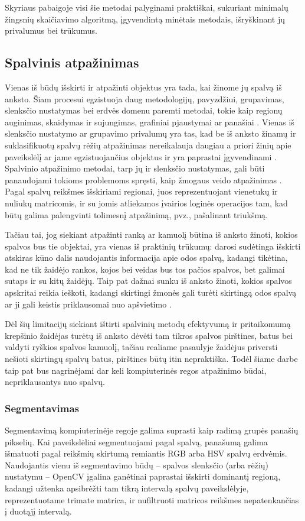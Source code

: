 \documentclass{VUMIFPSbakalaurinis}
\begin{document}
Skyriaus pabaigoje visi šie metodai palyginami praktiškai, sukuriant minimalų žingsnių skaičiavimo algoritmą, įgyvendintą minėtais metodais, išryškinant jų privalumus bei trūkumus. 

\subsection{Spalvinis atpažinimas}
Vienas iš būdų išskirti ir atpažinti objektus yra tada, kai žinome jų spalvą iš anksto. Šiam procesui egzistuoja daug metodologijų, pavyzdžiui, grupavimas, slenksčio nustatymas bei erdvės domenu paremti metodai, tokie kaip regionų auginimas, skaidymas ir sujungimas, grafiniai pjaustymai ar panašiai \cite{segmentation_trends}. Vienas iš slenksčio nustatymo ar grupavimo privalumų yra tas, kad be iš anksto žinamų ir suklasifikuotų spalvų rėžių atpažinimas nereikalauja daugiau a priori žinių apie paveikslėlį ar jame egzistuojančius objektus ir yra paprastai įgyvendinami \cite{segmentation_trends}. Spalvinio atpažinimo metodai, tarp jų ir slenksčio nustatymas, gali būti panaudojami tokioms problemoms spręsti, kaip žmogaus veido atpažinimas \cite{WANG20011983}. Pagal spalvų reikšmes išskiriami regionai, juos reprezentuojant vienetukų ir nuliukų matricomis, ir su jomis atliekamos įvairios loginės operacijos tam, kad būtų galima palengvinti tolimesnį atpažinimą, pvz., pašalinant triukšmą. 

Tačiau tai, jog siekiant atpažinti ranką ar kamuolį būtina iš anksto žinoti, kokios spalvos bus tie objektai, yra vienas iš praktinių trūkumų: darosi sudėtinga išskirti atskiras kūno dalis naudojantis informacija apie odos spalvą, kadangi tikėtina, kad ne tik žaidėjo rankos, kojos bei veidas bus tos pačios spalvos, bet galimai sutaps ir su kitų žaidėjų. Taip pat dažnai sunku iš anksto žinoti, kokios spalvos apskritai reikia ieškoti, kadangi skirtingi žmonės gali turėti skirtingą odos spalvą ar ji gali keistis priklausomai nuo apšvietimo \cite{KAKUMANU20071106}. 

Dėl šių limitacijų siekiant ištirti spalvinių metodų efektyvumą ir pritaikomumą krepšinio žaidėjas turėtų iš anksto dėvėti tam tikros spalvos pirštines, batus bei valdyti ryškios spalvos kamuolį, tačiau realiame pasaulyje žaidėjus priversti nešioti skirtingų spalvų batus, pirštines būtų itin nepraktiška. Todėl šiame darbe taip pat bus nagrinėjami dar keli kompiuterinės regos atpažinimo būdai, nepriklausantys nuo spalvų. 

\subsubsection{Segmentavimas}
Segmentavimą kompiuterinėje regoje galima suprasti kaip radimą grupės panašių pikselių. Kai paveikslėliai segmentuojami pagal spalvą, panašumą galima išmatuoti pagal reikšmių skirtumą remiantis RGB arba HSV spalvų erdvėmis. Naudojantis vienu iš segmentavimo būdų – spalvos slenksčio (arba rėžių) nustatymu – OpenCV įgalina ganėtinai paprastai išskirti dominantį regioną, kadangi užtenka apsibrėžti tam tikrą intervalą spalvų paveikslėlyje, reprezentuotame trimate matrica, ir nufiltruoti matricos reikšmes nepatenkančias į duotąjį intervalą. 
\end{document}
